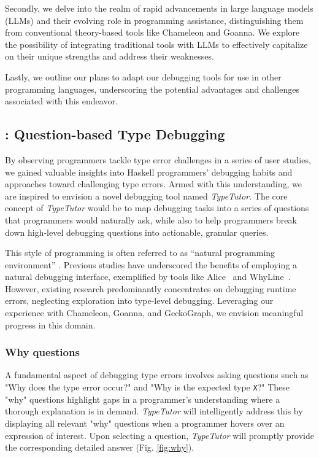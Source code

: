 Secondly, we delve into the realm of rapid advancements in large language models (LLMs) and their evolving role in programming assistance, distinguishing them from conventional theory-based tools like Chameleon and Goanna. We explore the possibility of integrating traditional tools with LLMs to effectively capitalize on their unique strengths and address their weaknesses.

Lastly, we outline our plans to adapt our debugging tools for use in other programming languages, underscoring the potential advantages and challenges associated with this endeavor.

\subsection{\typetutor: Question-based Type Debugging}

By observing programmers tackle type error challenges in a series of user studies, we gained valuable insights into Haskell programmers' debugging habits and approaches toward challenging type errors. Armed with this understanding, we are inspired to envision a novel debugging tool named \textit{TypeTutor}. The core concept of \textit{TypeTutor} would be to map debugging tasks into a series of questions that programmers would naturally ask, while also to help programmers break down high-level debugging questions into actionable, granular queries.

This style of programming is often referred to as ``natural programming environment'' \cite{Myers2004-fy}. Previous studies have underscored the benefits of employing a natural debugging interface, exemplified by tools like Alice~\cite{Conway2000-nn} and WhyLine~\cite{Ko2009-uf}. However, existing research predominantly concentrates on debugging runtime errors, neglecting exploration into type-level debugging.  Leveraging our experience with Chameleon, Goanna, and GeckoGraph, we envision meaningful progress in this domain.


\subsubsection{Why questions}

A fundamental aspect of debugging type errors involves asking questions such as "Why does the type error occur?" and "Why is the expected type \texttt{X}?" These "why" questions highlight gaps in a programmer's understanding where a thorough explanation is in demand. \textit{TypeTutor} will intelligently address this by displaying all relevant "why" questions when a programmer hovers over an expression of interest. Upon selecting a question, \textit{TypeTutor} will promptly provide the corresponding detailed answer (Fig. \ref{fig:why}).



